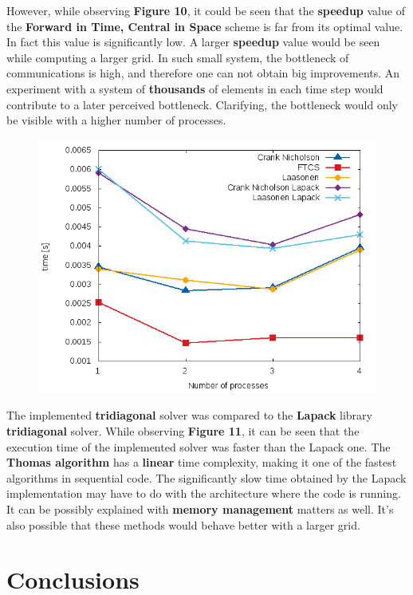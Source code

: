 \documentclass[12pt]{article}
\begin{document}
\par However, while observing \textbf{Figure 10}, it could be seen that the \textbf{speedup} value of the \textbf{Forward in Time, Central in Space} scheme is far from its optimal value. In fact this value is significantly low. A larger \textbf{speedup} value would be seen while computing a larger grid. In such small system, the bottleneck of communications is high, and therefore one can not obtain big improvements. An experiment with a system of \textbf{thousands} of elements in each time step would contribute to a later perceived bottleneck. Clarifying, the bottleneck would only be visible with a higher number of processes.

\begin{figure}[!htb]
  \centering
  \includegraphics[width=.65\linewidth]{lapack_times.png}
\end{figure}

\par The implemented \textbf{tridiagonal} solver was compared to the \textbf{Lapack} library \textbf{tridiagonal} solver. While observing \textbf{Figure 11}, it can be seen that the execution time of the implemented solver was faster than the Lapack one. The \textbf{Thomas algorithm} has a \textbf{linear} time complexity, making it one of the fastest algorithms in sequential code. The significantly slow time obtained by the Lapack implementation may have to do with the architecture where the code is running. It can be possibly explained with \textbf{memory management} matters as well. It's also possible that these methods would behave better with a larger grid.

\pagebreak
\section*{Conclusions}
\end{document}
